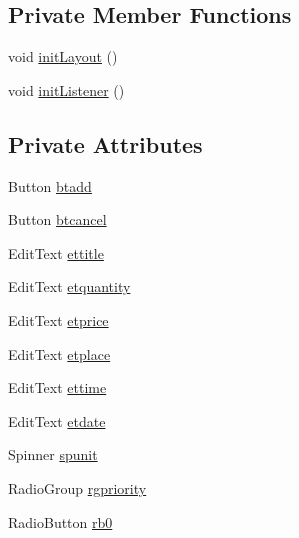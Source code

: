 \subsection*{Private Member Functions}
\begin{DoxyCompactItemize}
\item 
void \hyperlink{classvip2012_1_1g07_1_1shoppinglist_1_1AddNewItem_a19b39de21a41e9e1be868296a68e7182}{init\-Layout} ()
\item 
void \hyperlink{classvip2012_1_1g07_1_1shoppinglist_1_1AddNewItem_a5afe7aea60ceab9c844573cec4b4b3ab}{init\-Listener} ()
\end{DoxyCompactItemize}
\subsection*{Private Attributes}
\begin{DoxyCompactItemize}
\item 
Button \hyperlink{classvip2012_1_1g07_1_1shoppinglist_1_1AddNewItem_a9a6af431c3a6d7f21f932cbb56ef3551}{btadd}
\item 
Button \hyperlink{classvip2012_1_1g07_1_1shoppinglist_1_1AddNewItem_a09f30c8abf154eae4e236c646a9275a0}{btcancel}
\item 
Edit\-Text \hyperlink{classvip2012_1_1g07_1_1shoppinglist_1_1AddNewItem_a080d6084fc4d49b9d7cd9f9b783ffb0f}{ettitle}
\item 
Edit\-Text \hyperlink{classvip2012_1_1g07_1_1shoppinglist_1_1AddNewItem_a7f7b4a037f061e820727ae1a27ac5bd8}{etquantity}
\item 
Edit\-Text \hyperlink{classvip2012_1_1g07_1_1shoppinglist_1_1AddNewItem_a5b57a11f84ecfe992ffc9d68b86d190b}{etprice}
\item 
Edit\-Text \hyperlink{classvip2012_1_1g07_1_1shoppinglist_1_1AddNewItem_a77e3f3e5dcdbd145dc41a61aca41dad4}{etplace}
\item 
Edit\-Text \hyperlink{classvip2012_1_1g07_1_1shoppinglist_1_1AddNewItem_ac06c9342f6919f20558bfd41cf738d46}{ettime}
\item 
Edit\-Text \hyperlink{classvip2012_1_1g07_1_1shoppinglist_1_1AddNewItem_a5faaaed4abf7a2320da4e66d65013ea3}{etdate}
\item 
Spinner \hyperlink{classvip2012_1_1g07_1_1shoppinglist_1_1AddNewItem_a846a1491398d85fe8f564eaed3246fa3}{spunit}
\item 
Radio\-Group \hyperlink{classvip2012_1_1g07_1_1shoppinglist_1_1AddNewItem_a3ce595b764c1781577f67e59beb5a096}{rgpriority}
\item 
Radio\-Button \hyperlink{classvip2012_1_1g07_1_1shoppinglist_1_1AddNewItem_a546ca63e707f5fad276fdba12ff919de}{rb0}

\end{DoxyCompactItemize}
